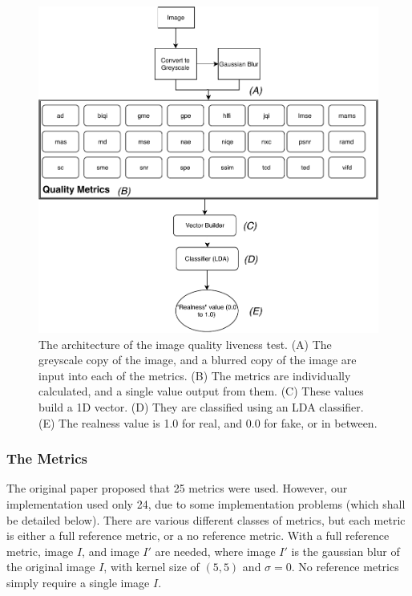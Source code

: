 \documentclass[11pt,a4paper]{article}
\begin{document}
            \begin{figure}
                \centering
                \includegraphics[width=\linewidth]{ImageQualityLivenessTest.pdf}
                \caption{The architecture of the image quality liveness test. (A) The greyscale copy of the image, and a blurred copy of the image are input into each of the metrics.
                (B) The metrics are individually calculated, and a single value output from them. (C) These values build a 1D vector. (D) They are classified using an LDA classifier. (E) The realness value
                is 1.0 for real, and 0.0 for fake, or in between.}
                \label{ImageQualityLivenessTestDiagram}
            \end{figure}
    
            \subsubsection{The Metrics}
            The original paper proposed that 25 metrics were used. However, our implementation used only 24, due to some implementation problems (which shall be detailed below).
            There are various different classes of metrics, but each metric is either a full reference metric, or a no reference metric. With a full reference metric, image $I$, and image $I'$ are needed,
            where image $I'$ is the gaussian blur of the original image $I$, with kernel size of $(5,5)$ and $\sigma = 0$. No reference metrics simply require a single image $I$.
\end{document}
